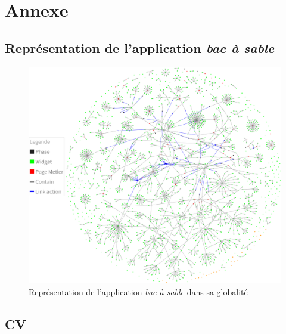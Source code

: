 \newpage
\appendix

\hypertarget{annexe}{%
\section{Annexe}\label{annexe}}

\hypertarget{appendix:representationGlobal}{%
\subsection{\texorpdfstring{Représentation de l'application \emph{bac à
sable}}{Représentation de l'application bac à sable}}\label{appendix:representationGlobal}}

\begin{figure}
\hypertarget{firework}{%
\centering
\includegraphics{figures/firework.png}
\caption{Représentation de l'application \emph{bac à sable} dans sa
globalité}\label{firework}
}
\end{figure}

\newpage

\hypertarget{cv}{%
\subsection{CV}\label{cv}}

